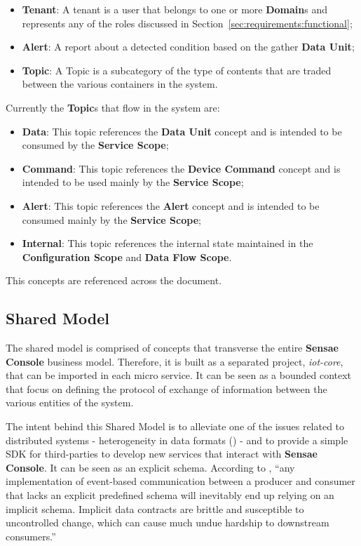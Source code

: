 \begin{itemize}
   \item \textbf{Tenant}: A tenant is a user that belongs to one or more \textbf{Domain}s and represents any of the roles discussed in Section~\ref{sec:requirements:functional};
   \item \textbf{Alert}: A report about a detected condition based on the gather \textbf{Data Unit};
   \item \textbf{Topic}: A Topic is a subcategory of the type of contents that are traded between the various containers in the system.
\end{itemize}

Currently the \textbf{Topic}s that flow in the system are:

\begin{itemize}
   \item \textbf{Data}: This topic references the \textbf{Data Unit} concept and is intended to be consumed by the \textbf{Service Scope};
   \item \textbf{Command}: This topic references the \textbf{Device Command} concept and is intended to be used mainly by the \textbf{Service Scope};
   \item \textbf{Alert}: This topic references the \textbf{Alert} concept and is intended to be consumed mainly by the \textbf{Service Scope};
   \item \textbf{Internal}: This topic references the internal state maintained in the \textbf{Configuration Scope} and \textbf{Data Flow Scope}.
\end{itemize}

This concepts are referenced across the document.

\subsection{Shared Model}
\label{subsec:design:domain:shared_model}

The shared model is comprised of concepts that transverse the entire \textbf{Sensae Console} business model. Therefore, it is built as a separated project, \textit{iot-core}, that can be imported in each micro service. It can be seen as a bounded context that focus on defining the protocol of exchange of information between the various entities of the system.

The intent behind this Shared Model is to alleviate one of the issues related to distributed systems - heterogeneity in data formats (\cite{nadiminti2006distributed}) - and to provide a simple \gls{SDK} for third-parties to develop new services that interact with \textbf{Sensae Console}. It can be seen as an explicit schema. According to \cite{explicitsharedmodel}, ``any implementation of event-based communication between a producer and consumer that lacks an explicit predefined schema will inevitably end up relying on an implicit schema. Implicit data contracts are brittle and susceptible to uncontrolled change, which can cause much undue hardship to downstream consumers.''

